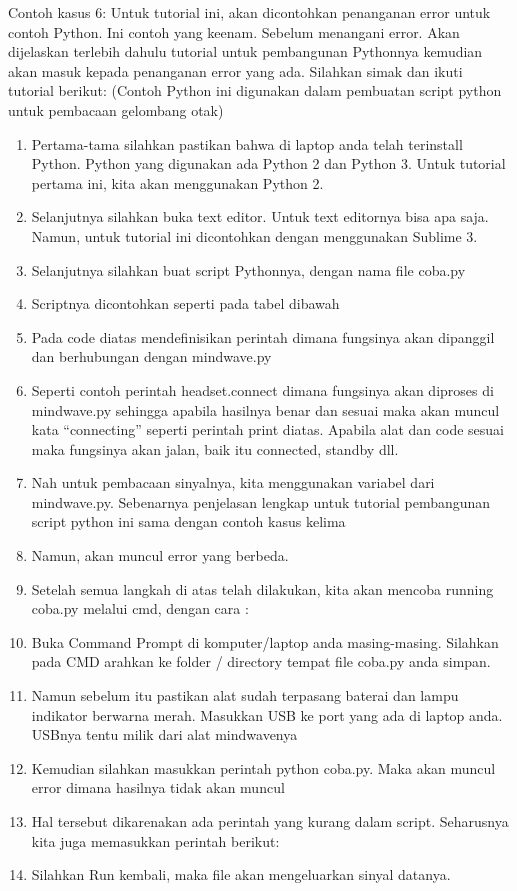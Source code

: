 Contoh kasus 6: Untuk tutorial ini, akan dicontohkan penanganan error untuk contoh Python. Ini contoh yang keenam. Sebelum menangani error. Akan dijelaskan terlebih dahulu tutorial untuk pembangunan Pythonnya kemudian akan masuk kepada penanganan error yang ada. Silahkan simak dan ikuti tutorial berikut: 
(Contoh Python ini digunakan dalam pembuatan script python untuk pembacaan gelombang otak)
\begin{enumerate}
\item Pertama-tama silahkan pastikan bahwa di laptop anda telah terinstall Python. Python yang digunakan ada Python 2 dan Python 3. Untuk tutorial pertama ini, kita akan menggunakan Python 2.
\item Selanjutnya silahkan buka text editor. Untuk text editornya bisa apa saja. Namun, untuk tutorial ini dicontohkan dengan menggunakan Sublime 3.
\item Selanjutnya silahkan buat script Pythonnya, dengan nama file coba.py
\item Scriptnya dicontohkan seperti pada tabel dibawah 
\item Pada code diatas mendefinisikan perintah dimana fungsinya akan dipanggil dan berhubungan dengan mindwave.py
\item Seperti contoh perintah headset.connect dimana fungsinya akan diproses di mindwave.py sehingga apabila hasilnya benar dan sesuai maka akan muncul kata “connecting” seperti perintah print diatas. Apabila alat dan code sesuai maka fungsinya akan jalan, baik itu connected, standby dll. 
\item Nah untuk pembacaan sinyalnya, kita menggunakan variabel dari mindwave.py. Sebenarnya penjelasan lengkap untuk tutorial pembangunan script python ini sama dengan contoh kasus kelima
\item Namun, akan muncul error yang berbeda.
\item Setelah semua langkah di atas telah dilakukan, kita akan mencoba running coba.py melalui cmd, dengan cara :
\item Buka Command Prompt di komputer/laptop anda masing-masing. Silahkan pada CMD arahkan ke folder / directory tempat file coba.py anda simpan.
\item Namun sebelum itu pastikan alat sudah terpasang baterai dan lampu indikator berwarna merah. Masukkan USB ke port yang ada di laptop anda. USBnya tentu milik dari alat mindwavenya
\item Kemudian silahkan masukkan perintah python coba.py. Maka akan muncul error dimana hasilnya tidak akan muncul
\item Hal tersebut dikarenakan ada perintah yang kurang dalam script. Seharusnya kita juga memasukkan perintah berikut:
\item Silahkan Run kembali, maka file akan mengeluarkan sinyal datanya.
\end{enumerate}

